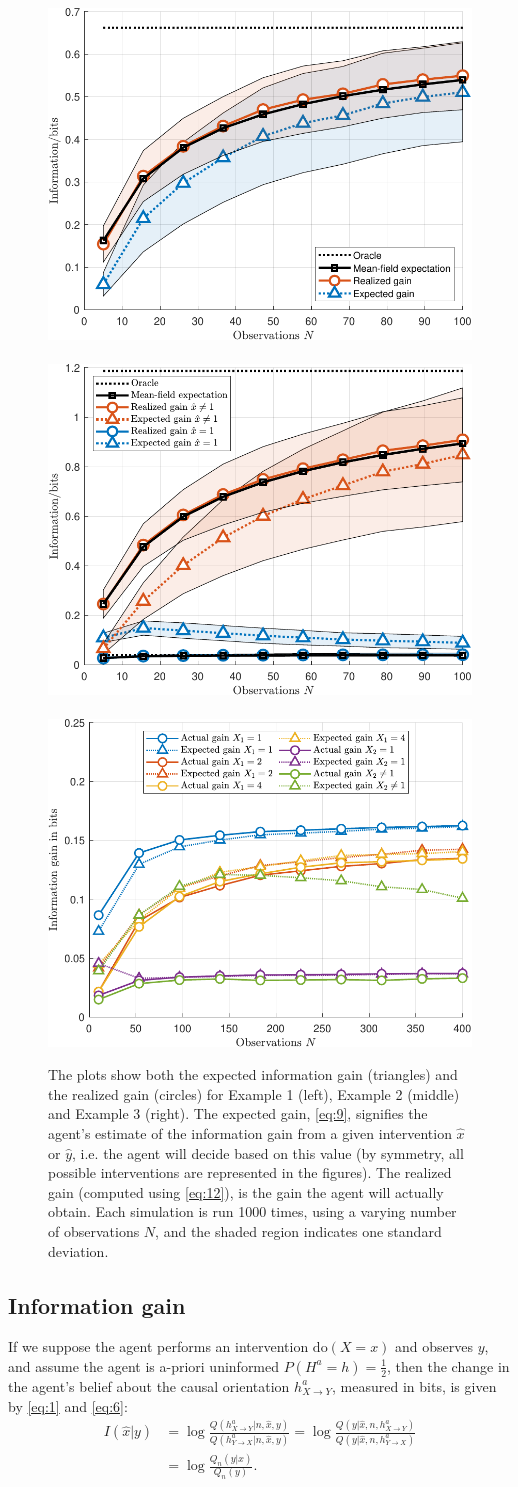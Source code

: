 \documentclass[letterpaper]{article} %
\newcommand{\doo}{\textrm{do}}
\begin{document}
\begin{figure}[t!]
\centering
\includegraphics[width=.33\linewidth]{diag-crop}~
\includegraphics[width=.33\linewidth]{single-crop}~
\includegraphics[width=.33\linewidth]{multi-crop}
\caption{The plots show both the expected information gain (triangles) and the realized gain (circles) for Example 1 (left), Example 2 (middle) and Example 3 (right). The expected gain, \cref{eq:9}, signifies the agent's estimate of the information gain from a given intervention $\hat x$ or $\hat y$, i.e. the agent will decide based on this value (by symmetry, all possible interventions are represented in the figures). The realized gain (computed using  \cref{eq:12}), is the gain the agent will actually obtain. Each simulation is run 1000 times, using a varying number of observations $N$, and the shaded region indicates one standard deviation. }\label{fig3}
\end{figure}


\subsection{Information gain}
If we suppose the agent performs an intervention $\doo(X=x)$ and observes $y$, and assume the agent is a-priori uninformed $P(H^a=h) = \frac{1}{2}$, then the change in the agent's belief about the causal orientation $h^a_{X\rightarrow Y}$, measured in bits, is given by \cref{eq:1} and \cref{eq:6}: %
\begin{align}
I(\hat x | y) & =
\log \frac{Q( h^a_{X \rightarrow Y} | n, \hat x, y ) }{ Q( h^a_{Y \rightarrow X} | n, \hat x, y ) }
= \log \frac{ Q(y | \hat x, n, h^a_{X\rightarrow Y} ) }
{ Q(y | \hat x, n, h^a_{ Y \rightarrow X} ) } \nonumber \\
& = \log \frac{ Q_n(y | x)  }
{ Q_n(y ) }.  \label{eq:6}
\end{align}
\end{document}
